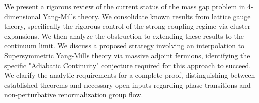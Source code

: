 We present a rigorous review of the current status of the mass gap problem in 4-dimensional Yang-Mills theory. We consolidate known results from lattice gauge theory, specifically the rigorous control of the strong coupling regime via cluster expansions. We then analyze the obstruction to extending these results to the continuum limit. We discuss a proposed strategy involving an interpolation to Supersymmetric Yang-Mills theory via massive adjoint fermions, identifying the specific "Adiabatic Continuity" conjecture required for this approach to succeed. We clarify the analytic requirements for a complete proof, distinguishing between established theorems and necessary open inputs regarding phase transitions and non-perturbative renormalization group flow.



